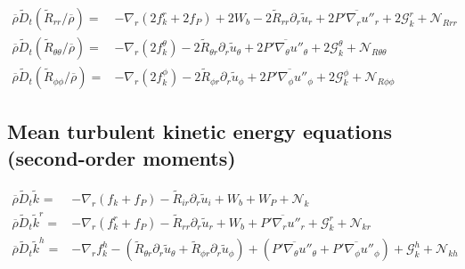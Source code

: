 \documentclass[10pt,paper=a4]{report}
\newcommand{\eht}{\overline}
\newcommand{\fht}{\widetilde}
\newcommand{\fav}{\widetilde}
\newcommand{\av}{\overline}
\begin{document}
\begin{table}[!h]
\begin{align}
\eht{\rho}\fht{D}_t \left( \fht{R}_{rr} / \eht{\rho} \right) = & -\nabla_r ( 2 f_k^r + 2 f_P ) + 2 W_b - 2\fht{R}_{rr}\partial_r \fht{u}_r + 2\eht{P'\nabla_r u''_r} + 2 {\mathcal G_k^r} + {\mathcal N_{Rrr}} \\
\eht{\rho}\fht{D}_t \left( \fht{R}_{\theta \theta} / \eht{\rho} \right) = & -\nabla_r ( 2 f_k^\theta )- 2\fht{R}_{\theta r}\partial_r \fht{u}_\theta +2\eht{P' \nabla_\theta u''_\theta}  + 2 {\mathcal G_k^\theta} + {\mathcal N_{R \theta \theta}}  \\
\eht{\rho}\fht{D}_t \left( \fht{R}_{\phi \phi} / \eht{\rho} \right) = & - \nabla_r ( 2 f_k^\phi ) - 2\fht{R}_{\phi r}\partial_r \fht{u}_\phi + 2\eht{P' \nabla_\phi u''_\phi}   + 2 {\mathcal G_k^\phi} + {\mathcal N_{R \phi \phi}}
\end{align}
\end{table}

\subsection{Mean turbulent kinetic energy equations (second-order moments)}

\begin{table}[!h]
\label{tab:rans}
\begin{align}
\av{\rho} \fav{D}_t \fav{k}^{ } = &  -\nabla_r ( f_k +  f_P ) - \fht{R}_{ir}\partial_r \fht{u}_i + W_b + W_P + {\mathcal N_k}  \label{eq:rans_tke} \\
\av{\rho} \fav{D}_t \fav{k}^r =  & -\nabla_r  ( f_k^r + f_P )  - \fht{R}_{rr}\partial_r \fht{u}_r + W_b  + \eht{P'\nabla_r u''_r} + {\mathcal G_k^r} +  {\mathcal N_{kr}} \label{eq:rans_ekin_r} \\
\av{\rho} \fav{D}_t \fav{k}^h =  &  -\nabla_r f_k^h - (\fht{R}_{\theta r}\partial_r \fht{u}_\theta + \fht{R}_{\phi r}\partial_r \fht{u}_\phi) + (\eht{P' \nabla_\theta u''_\theta} + \eht{P' \nabla_\phi u''_\phi}) + {\mathcal G_k^h} + {\mathcal N_{kh}} \label{eq:rans_ekin_h} \\
\end{align}
\end{table}
\end{document}
